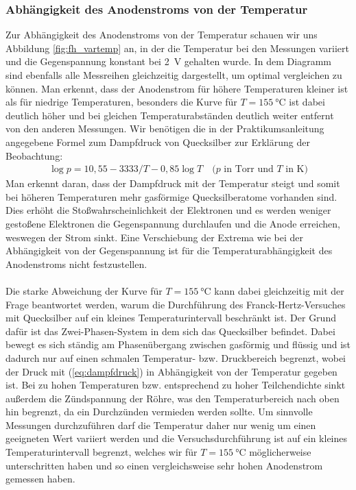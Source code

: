 \documentclass[11pt, a4paper]{article}
\begin{document}
\subsubsection{Abhängigkeit des Anodenstroms von der Temperatur}
Zur Abhängigkeit des Anodenstroms von der Temperatur schauen wir uns Abbildung \ref{fig:fh_vartemp} an, in der die Temperatur bei den Messungen variiert und die Gegenspannung konstant bei \SI{2}{\volt} gehalten wurde.
In dem Diagramm sind ebenfalls alle Messreihen gleichzeitig dargestellt, um optimal vergleichen zu können.
Man erkennt, dass der Anodenstrom für höhere Temperaturen kleiner ist als für niedrige Temperaturen, besonders die Kurve für $T=\SI{155}{\degreeCelsius}$ ist dabei deutlich höher und bei gleichen Temperaturabständen deutlich weiter entfernt von den anderen Messungen.
Wir benötigen die in der Praktikumsanleitung angegebene Formel zum Dampfdruck von Quecksilber zur Erklärung der Beobachtung:
\begin{align}
\log p = 10,55-3333/T-0,85\log T \quad \text{($p$ in Torr und $T$ in K)}
\label{eq:dampfdruck}
\end{align}
Man erkennt daran, dass der Dampfdruck mit der Temperatur steigt und somit bei höheren Temperaturen mehr gasförmige Quecksilberatome vorhanden sind.
Dies erhöht die Stoßwahrscheinlichkeit der Elektronen und es werden weniger gestoßene Elektronen die Gegenspannung durchlaufen und die Anode erreichen, weswegen der Strom sinkt.
Eine Verschiebung der Extrema wie bei der Abhängigkeit von der Gegenspannung ist für die Temperaturabhängigkeit des Anodenstroms nicht festzustellen.
\\
\\
Die starke Abweichung der Kurve für $T=\SI{155}{\degreeCelsius}$ kann dabei gleichzeitig mit der Frage beantwortet werden, warum die Durchführung des Franck-Hertz-Versuches mit Quecksilber auf ein kleines Temperaturintervall beschränkt ist.
Der Grund dafür ist das Zwei-Phasen-System in dem sich das Quecksilber befindet.
Dabei bewegt es sich ständig am Phasenübergang zwischen gasförmig und flüssig und ist dadurch nur auf einen schmalen Temperatur- bzw. Druckbereich begrenzt, wobei der Druck mit (\ref{eq:dampfdruck}) in Abhängigkeit von der Temperatur gegeben ist.
Bei zu hohen Temperaturen bzw. entsprechend zu hoher Teilchendichte sinkt außerdem die Zündspannung der Röhre, was den Temperaturbereich nach oben hin begrenzt, da ein Durchzünden vermieden werden sollte. 
Um sinnvolle Messungen durchzuführen darf die Temperatur daher nur wenig um einen geeigneten Wert variiert werden und die Versuchsdurchführung ist auf ein kleines Temperaturintervall begrenzt, welches wir für $T=\SI{155}{\degreeCelsius}$ möglicherweise unterschritten haben und so einen vergleichsweise sehr hohen Anodenstrom gemessen haben.
\end{document}
